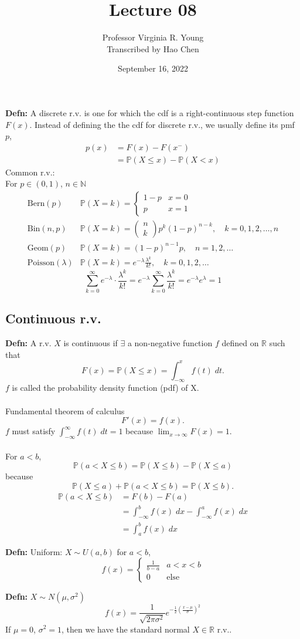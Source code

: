 \documentclass[a4paper]{article}
\title{Lecture 08}
\author{Professor Virginia R. Young\\ \small{Transcribed by Hao Chen}}
\date{September 16, 2022}
\newcommand{\n}{\hfill\break}
\newcommand{\defn}[1]{\par\noindent\settowidth{\hangindent}{\textbf{Defn: }}\textbf{Defn: }#1\n}
\newcommand{\reals}{\mathbb{R}}
\newcommand{\R}{\reals}
\newcommand{\natures}{\mathbb{N}}
\newcommand{\N}{\natures}
\newcommand{\Prob}{\mathbb{P}}
\renewcommand{\P}{\Prob}
\begin{document}
\maketitle

\defn{A discrete r.v. is one for which the cdf is a right-continuous step function $F(x)$. Instead of defining the the cdf for discrete r.v., we usually define its pmf $p$,
\begin{align*}
    p(x)&=F(x)-F(x^-) \\
    &=\P(X\leq x)-\P(X<x)
\end{align*}
Common r.v.: \\
For $p\in(0, 1)$, $n\in\N$
\[\begin{array}{lc}
    \text{Bern}(p) &  \P(X=k)=\left\{\begin{array}{lc}1-p&x=0\\p&x=1\end{array}\right.\\
    \text{Bin}(n, p) & \P(X=k)=\begin{pmatrix}n\\k\end{pmatrix}p^k(1-p)^{n-k}, \quad k=0,1,2,\dots, n \\
    \text{Geom}(p) & \P(X=k)=(1-p)^{n-1}p, \quad n=1,2,\dots \\
    \text{Poisson}(\lambda) & \P(X=k)=e^{-\lambda}\frac{\lambda^k}{k!}, \quad k=0,1,2,\dots 
\end{array}\]
\[\sum^\infty_{k=0}e^{-\lambda}\cdot\frac{\lambda^k}{k!}=e^{-\lambda}\sum^\infty_{k=0}\frac{\lambda^k}{k!}=e^{-\lambda}e^\lambda=1\]
}

\subsection*{Continuous r.v.}
\defn{A r.v. $X$ is continuous if $\exists$ a non-negative function $f$ defined on $\R$ such that
\[F(x)=\P(X\leq x)=\int_{-\infty}^{x}f(t)\;dt.\]
$f$ is called the probability density function (pdf) of X. \\\\
Fundamental theorem of calculus
\[F'(x)=f(x).\]
$f$ must satisfy $\int_{-\infty}^{\infty}f(t)\;dt=1$ because $\lim_{x\rightarrow\infty}F(x)=1$. \\\\
For $a<b$,
\[\P(a<X\leq b)=\P(X\leq b)-\P(X\leq a)\]
because
\[\P(X\leq a)+\P(a<X\leq b)=\P(X\leq b).\]
\begin{align*}
    \P(a<X\leq b)&=F(b)-F(a) \\
    &=\int^b_{-\infty}f(x)\;dx-\int^a_{-\infty}f(x)\;dx \\
    &=\int^b_a f(x)\;dx
\end{align*}
}

\defn{ Uniform: $X\sim U(a, b)$ for $a<b$,
\[f(x)=\left\{\begin{array}{lc}\frac{1}{b-a}&a<x<b\\0&\text{else}\end{array}\right.\]
}

\defn{$X\sim N(\mu, \sigma^2)$}
\[f(x)=\frac{1}{\sqrt{2\pi\sigma^2}}e^{-\frac{1}{2}\left(\frac{x-\mu}{\sigma}\right)^2}\]
If $\mu=0$, $\sigma^2=1$, then we have the standard normal $X\in\R$ r.v..
\end{document}
